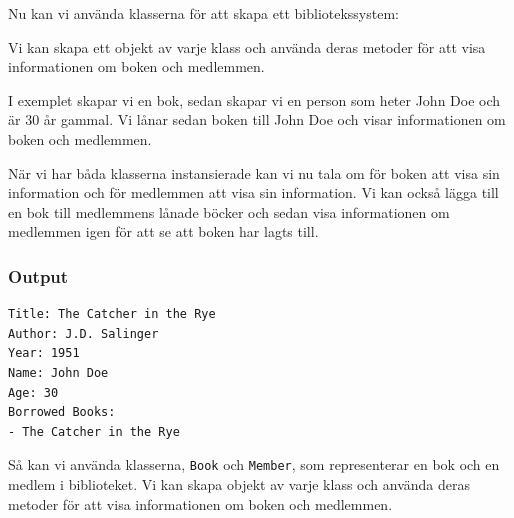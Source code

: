 Nu kan vi använda klasserna för att skapa ett bibliotekssystem:

\hypertarget{cb3}{}
\begin{Shaded}
\begin{Highlighting}[]
\OperatorTok{=}  \OperatorTok{(}\OperatorTok{,} \OperatorTok{,} \OperatorTok{);}
\OperatorTok{=}  \OperatorTok{(}\OperatorTok{,} \OperatorTok{);}
\OperatorTok{(}\OperatorTok{);}

\OperatorTok{();}
\OperatorTok{();}
\end{Highlighting}
\end{Shaded}

Vi kan skapa ett objekt av varje klass och använda deras metoder för att
visa informationen om boken och medlemmen.

I exemplet skapar vi en bok, sedan skapar vi en person som heter John
Doe och är 30 år gammal. Vi lånar sedan boken till John Doe och visar
informationen om boken och medlemmen.

När vi har båda klasserna instansierade kan vi nu tala om för boken att
visa sin information och för medlemmen att visa sin information. Vi kan
också lägga till en bok till medlemmens lånade böcker och sedan visa
informationen om medlemmen igen för att se att boken har lagts till.

\hypertarget{output}{%
\subsubsection{Output}\label{output}}

\begin{verbatim}
Title: The Catcher in the Rye
Author: J.D. Salinger
Year: 1951
Name: John Doe
Age: 30
Borrowed Books:
- The Catcher in the Rye
\end{verbatim}

Så kan vi använda klasserna, \texttt{Book} och \texttt{Member}, som
representerar en bok och en medlem i biblioteket. Vi kan skapa objekt av
varje klass och använda deras metoder för att visa informationen om
boken och medlemmen.

